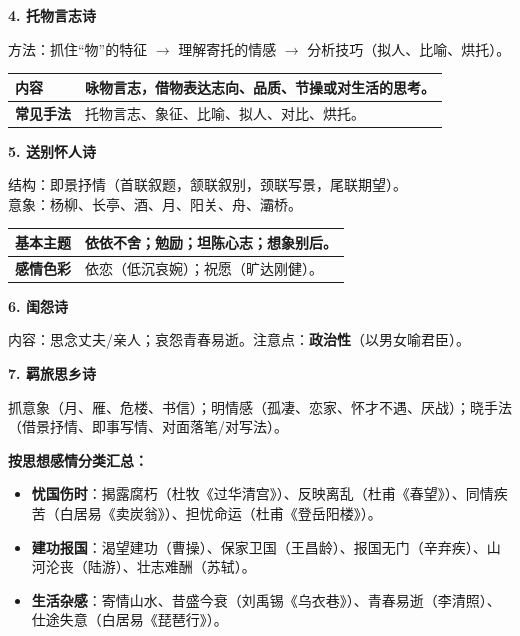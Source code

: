 \documentclass[11pt,a4paper]{article}
\begin{document}
\textbf{4. 托物言志诗}

方法：抓住“物”的特征 $\to$ 理解寄托的情感 $\to$ 分析技巧（拟人、比喻、烘托）。

\begin{tcolorbox}[colback=white, colframe=black!50, title=托物言志诗特征, boxrule=0.5pt, sharp corners=downhill]
\begin{tabularx}{\textwidth}{@{}lX@{}}
\textbf{内容} & 咏物言志，借物表达志向、品质、节操或对生活的思考。 \\ \midrule
\textbf{常见手法} & 托物言志、象征、比喻、拟人、对比、烘托。 \\
\end{tabularx}
\end{tcolorbox}

\textbf{5. 送别怀人诗}

结构：即景抒情（首联叙题，颔联叙别，颈联写景，尾联期望）。\\
意象：杨柳、长亭、酒、月、阳关、舟、灞桥。

\begin{tcolorbox}[colback=white, colframe=black!50, title=送别怀人诗特征, boxrule=0.5pt, sharp corners=downhill]
\begin{tabularx}{\textwidth}{@{}lX@{}}
\textbf{基本主题} & 依依不舍；勉励；坦陈心志；想象别后。 \\ \midrule
\textbf{感情色彩} & 依恋（低沉哀婉）；祝愿（旷达刚健）。 \\
\end{tabularx}
\end{tcolorbox}

\textbf{6. 闺怨诗}

内容：思念丈夫/亲人；哀怨青春易逝。注意点：\textbf{政治性}（以男女喻君臣）。

\textbf{7. 羁旅思乡诗}

抓意象（月、雁、危楼、书信）；明情感（孤凄、恋家、怀才不遇、厌战）；晓手法（借景抒情、即事写情、对面落笔/对写法）。

\textbf{按思想感情分类汇总：}
\begin{itemize}
    \item \textbf{忧国伤时}：揭露腐朽（杜牧《过华清宫》）、反映离乱（杜甫《春望》）、同情疾苦（白居易《卖炭翁》）、担忧命运（杜甫《登岳阳楼》）。
    \item \textbf{建功报国}：渴望建功（曹操）、保家卫国（王昌龄）、报国无门（辛弃疾）、山河沦丧（陆游）、壮志难酬（苏轼）。
    \item \textbf{生活杂感}：寄情山水、昔盛今衰（刘禹锡《乌衣巷》）、青春易逝（李清照）、仕途失意（白居易《琵琶行》）。
\end{itemize}
\end{document}
